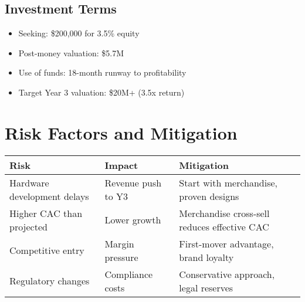 \documentclass[11pt]{article}
\begin{document}
\subsection{Investment Terms}
\begin{itemize}
  \item Seeking: \$200,000 for 3.5\% equity
  \item Post-money valuation: \$5.7M
  \item Use of funds: 18-month runway to profitability
  \item Target Year 3 valuation: \$20M+ (3.5x return)
\end{itemize}

\section{Risk Factors and Mitigation}

\begin{table}[H]
\centering
\begin{tabularx}{\linewidth}{l X X}
\toprule
Risk & Impact & Mitigation \\\midrule
Hardware development delays & Revenue push to Y3 & Start with merchandise, proven designs \\
Higher CAC than projected & Lower growth & Merchandise cross-sell reduces effective CAC \\
Competitive entry & Margin pressure & First-mover advantage, brand loyalty \\
Regulatory changes & Compliance costs & Conservative approach, legal reserves \\
\bottomrule
\end{tabularx}
\end{table}
\end{document}
